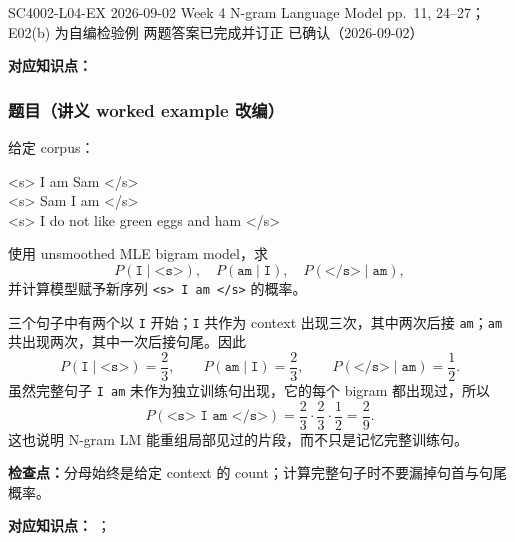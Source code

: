 

\examplemeta
  {SC4002-L04-EX}
  {2026-09-02}
  {Week 4 N-gram Language Model pp.~11, 24--27；E02(b) 为自编检验例}
  {两题答案已完成并订正}
  {已确认（2026-09-02）}


\textbf{对应知识点：}

\subsubsection*{题目（讲义 worked example 改编）}

给定 corpus：
\begin{center}
\ttfamily
<s> I am Sam </s>\\
<s> Sam I am </s>\\
<s> I do not like green eggs and ham </s>
\end{center}
使用 unsmoothed MLE bigram model，求
\[
  P(\texttt{I}\mid\texttt{<s>}),\quad
  P(\texttt{am}\mid\texttt{I}),\quad
  P(\texttt{</s>}\mid\texttt{am}),
\]
并计算模型赋予新序列 \texttt{<s> I am </s>} 的概率。

\begin{workedsolution}
三个句子中有两个以 \texttt{I} 开始；\texttt{I} 共作为 context 出现三次，其中两次后接 \texttt{am}；\texttt{am} 共出现两次，其中一次后接句尾。因此
\[
  P(\texttt{I}\mid\texttt{<s>})=\frac{2}{3},\qquad
  P(\texttt{am}\mid\texttt{I})=\frac{2}{3},\qquad
  P(\texttt{</s>}\mid\texttt{am})=\frac{1}{2}.
\]
虽然完整句子 \texttt{I am} 未作为独立训练句出现，它的每个 bigram 都出现过，所以
\[
  P(\texttt{<s> I am </s>})
  =\frac{2}{3}\cdot\frac{2}{3}\cdot\frac{1}{2}
  =\frac{2}{9}.
\]
这也说明 N-gram LM 能重组局部见过的片段，而不只是记忆完整训练句。
\end{workedsolution}

\textbf{检查点：}分母始终是给定 context 的 count；计算完整句子时不要漏掉句首与句尾概率。


\textbf{对应知识点：}
；

